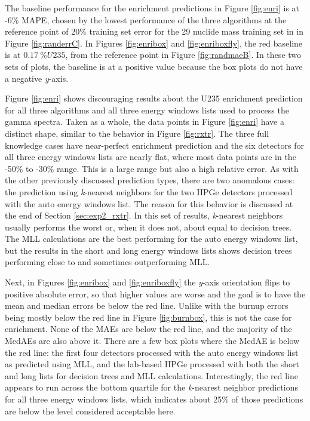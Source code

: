 The baseline performance for the enrichment predictions in Figure
\ref{fig:enri} is at -6\% \gls{MAPE}, chosen by the lowest performance of the
three algorithms at the reference point of 20\% training set error for the 29
nuclide mass training set in in Figure \ref{fig:randerrC}. In Figures
\ref{fig:enribox} and \ref{fig:enriboxfly}, the red baseline is at $0.17\:\%
U235$, from the reference point in Figure \ref{fig:randmaeB}.  In these two
sets of plots, the baseline is at a positive value because the box plots do not
have a negative \textit{y}-axis. 

Figure \ref{fig:enri} shows discouraging results about the \gls{U235}
enrichment prediction for all three algorithms and all three energy windows
lists used to process the gamma spectra.  Taken as a whole, the data points in
Figure \ref{fig:enri} have a distinct shape, similar to the behavior in Figure
\ref{fig:rxtr}.  The three full knowledge cases have near-perfect enrichment
prediction and the six detectors for all three energy windows lists are nearly
flat, where most data points are in the -50\% to -30\% range. This is a large
range but also a high relative error.  As with the other previously discussed
prediction types, there are two anomalous cases: the prediction using
\textit{k}-nearest neighbors for the two \gls{HPGe} detectors processed with
the auto energy windows list. The reason for this behavior is discussed at the
end of Section \ref{sec:exp2_rxtr}. In this set of results, \textit{k}-nearest
neighbors usually performs the worst or, when it does not, about equal to
decision trees. The \gls{MLL} calculations are the best performing for the auto
energy windows list, but the results in the short and long energy windows lists
shows decision trees performing close to and sometimes outperforming \gls{MLL}.

Next, in Figures \ref{fig:enribox} and \ref{fig:enriboxfly} the \textit{y}-axis
orientation flips to positive absolute error, so that higher values are worse
and the goal is to have the mean and median errors be below the red line.
Unlike with the burnup errors being mostly below the red line in Figure
\ref{fig:burnbox}, this is not the case for enrichment. None of the \gls{MAE}s
are below the red line, and the majority of the \gls{MedAE}s are also above it.
There are a few box plots where the \gls{MedAE} is below the red line: the
first four detectors processed with the auto energy windows list as predicted
using \gls{MLL}, and the lab-based \gls{HPGe} processed with both the short and
long lists for decision trees and \gls{MLL} calculations.  Interestingly, the
red line appears to run across the bottom quartile for the \textit{k}-nearest
neighbor predictions for all three energy windows lists, which indicates about
25\% of those predictions are below the level considered acceptable here.  

